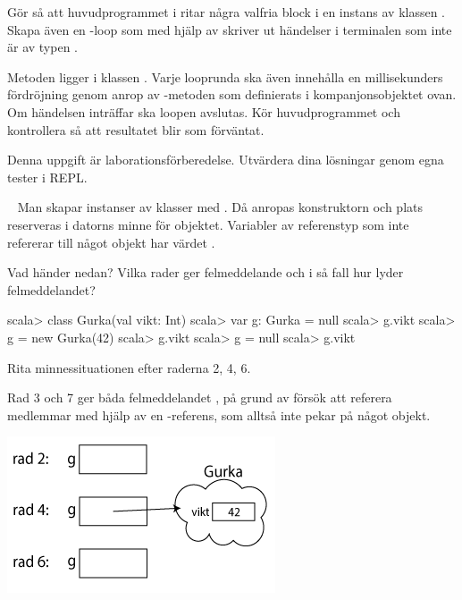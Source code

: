 \Subtask Gör så att huvudprogrammet i  ritar några valfria block i en instans av klassen . Skapa även en -loop som med hjälp av  skriver ut händelser i terminalen som inte är av typen . 

Metoden  ligger i klassen . Varje looprunda ska även innehålla en  millisekunders fördröjning genom anrop av -metoden som definierats i kompanjonsobjektet  ovan. Om händelsen  inträffar ska loopen avslutas. Kör huvudprogrammet och kontrollera så att resultatet blir som förväntat.

\SOLUTION


\TaskSolved \what Denna uppgift är laborationsförberedelse. Utvärdera dina lösningar genom egna tester i REPL.

\QUESTEND






\ExtraTasks %



\QUESTBEGIN

\Task  \what~  Man skapar instanser av klasser med . Då anropas konstruktorn och plats reserveras i datorns minne för objektet. Variabler av referenstyp som inte refererar till något objekt har värdet .

\Subtask Vad händer nedan? Vilka rader ger felmeddelande och i så fall hur lyder felmeddelandet?

\begin{REPL}
scala> class Gurka(val vikt: Int)
scala> var g: Gurka = null
scala> g.vikt
scala> g = new Gurka(42)
scala> g.vikt
scala> g = null
scala> g.vikt
\end{REPL}

\Subtask Rita minnessituationen efter raderna 2, 4, 6.

\SOLUTION


\TaskSolved \what


\SubtaskSolved  Rad 3 och 7 ger båda felmeddelandet ,  på grund av försök att referera medlemmar med hjälp av en -referens, som alltså inte pekar på något objekt.

\SubtaskSolved  \includegraphics[scale=0.6]{../img/w06-solutions/1b}


